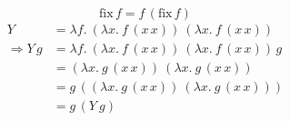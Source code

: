 \documentclass[aspectratio=169]{beamer}
\begin{document}
\begin{wallpaperframe}
\[
\text{fix}\, f = f\,(\text{fix}\, f)
\]
\begin{align*}
    Y &= \lambda f.\: (\lambda x.\:f\,(x\,x))\:(\lambda x.\:f\,(x\,x))\, \\
    \Rightarrow Y\, g &= \lambda f.\: (\lambda x.\:f\,(x\,x))\:(\lambda x.\:f\,(x\,x))\, g \\
    &= (\lambda x.\: g\, (x\,x))\:(\lambda x.\: g\, (x\,x)) \\
    &= g\, ((\lambda x.\: g\, (x\,x))\:(\lambda x.\: g\, (x\,x))) \\
    &= g\,(Y\:g)
  \end{align*}

\end{wallpaperframe}
\end{document}
